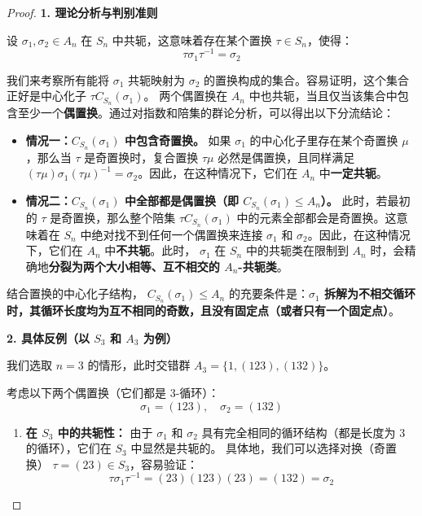 \documentclass[]{article}
\begin{document}
\begin{proof}
\bigskip
\noindent \textbf{1. 理论分析与判别准则}

设 $\sigma_1, \sigma_2 \in A_n$ 在 $S_n$ 中共轭，这意味着存在某个置换 $\tau \in S_n$，使得：
\[ \tau \sigma_1 \tau^{-1} = \sigma_2 \]

我们来考察所有能将 $\sigma_1$ 共轭映射为 $\sigma_2$ 的置换构成的集合。容易证明，这个集合正好是中心化子 $\tau C_{S_n}(\sigma_1)$。
两个偶置换在 $A_n$ 中也共轭，当且仅当该集合中包含至少一个\textbf{偶置换}。通过对指数和陪集的群论分析，可以得出以下分流结论：

\begin{itemize}
	\item \textbf{情况一：$C_{S_n}(\sigma_1)$ 中包含奇置换。}
	如果 $\sigma_1$ 的中心化子里存在某个奇置换 $\mu$，那么当 $\tau$ 是奇置换时，复合置换 $\tau \mu$ 必然是偶置换，且同样满足 $(\tau \mu) \sigma_1 (\tau \mu)^{-1} = \sigma_2$。因此，在这种情况下，它们在 $A_n$ 中\textbf{一定共轭}。
	
	\item \textbf{情况二：$C_{S_n}(\sigma_1)$ 中全部都是偶置换（即 $C_{S_n}(\sigma_1) \leqslant A_n$）。}
	此时，若最初的 $\tau$ 是奇置换，那么整个陪集 $\tau C_{S_n}(\sigma_1)$ 中的元素全部都会是奇置换。这意味着在 $S_n$ 中绝对找不到任何一个偶置换来连接 $\sigma_1$ 和 $\sigma_2$。因此，在这种情况下，它们在 $A_n$ 中\textbf{不共轭}。此时， $\sigma_1$ 在 $S_n$ 中的共轭类在限制到 $A_n$ 时，会精确地\textbf{分裂为两个大小相等、互不相交的 $A_n$-共轭类}。
\end{itemize}

结合置换的中心化子结构， $C_{S_n}(\sigma_1) \leqslant A_n$ 的充要条件是：\textbf{$\sigma_1$ 拆解为不相交循环时，其循环长度均为互不相同的奇数，且没有固定点（或者只有一个固定点）}。

\bigskip
\noindent \textbf{2. 具体反例（以 $S_3$ 和 $A_3$ 为例）}

我们选取 $n = 3$ 的情形，此时交错群 $A_3 = \{1, (123), (132)\}$。

考虑以下两个偶置换（它们都是 3-循环）：
\[ \sigma_1 = (123), \quad \sigma_2 = (132) \]

\begin{enumerate}
	\item \textbf{在 $S_3$ 中的共轭性：}
	由于 $\sigma_1$ 和 $\sigma_2$ 具有完全相同的循环结构（都是长度为 3 的循环），它们在 $S_3$ 中显然是共轭的。
	具体地，我们可以选择对换（奇置换） $\tau = (23) \in S_3$，容易验证：
	\[ \tau \sigma_1 \tau^{-1} = (23)(123)(23) = (132) = \sigma_2 \]
	

\end{enumerate}
\end{proof}
\end{document}
